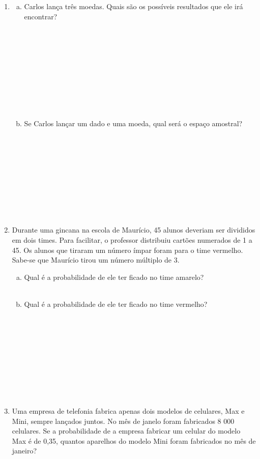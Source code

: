 \documentclass[a4paper,14pt]{article}
\begin{document}
\begin{multicols}{2}
\begin{enumerate}
		    \item \begin{enumerate}[a)]
		    	\item Carlos lança três moedas. Quais são os possíveis resultados que ele irá encontrar? \\\\\\\\\\\\\\\\\\\\
		    	\item Se Carlos lançar um dado e uma moeda, qual será o espaço amostral? \\\\\\\\\\\\\\\\\\\\
		    \end{enumerate}
		    \item Durante uma gincana na escola de Maurício, 45 alunos deveriam ser divididos em dois times. Para facilitar, o professor distribuiu cartões numerados de 1 a 45. Os alunos que tiraram um número ímpar foram para o time vermelho. Sabe-se que Maurício tirou um número múltiplo de 3.
		    \begin{enumerate}[a)]
		    	\item Qual é a probabilidade de ele ter ficado no time amarelo? \\\\
		    	\item Qual é a probabilidade de ele ter ficado no time vermelho? \\\\\\\\\\\\\\\\\\\\
		    \end{enumerate}
		    \item Uma empresa de telefonia fabrica apenas dois modelos de celulares, Max e Mini, sempre lançados juntos. No mês de janelo foram fabricados 8 000 celulares. Se a probabilidade de a empresa fabricar um celular do modelo Max é de 0,35, quantos aparelhos do modelo Mini foram fabricados no mês de janeiro? \newpage

\end{enumerate}
\end{multicols}
\end{document}
